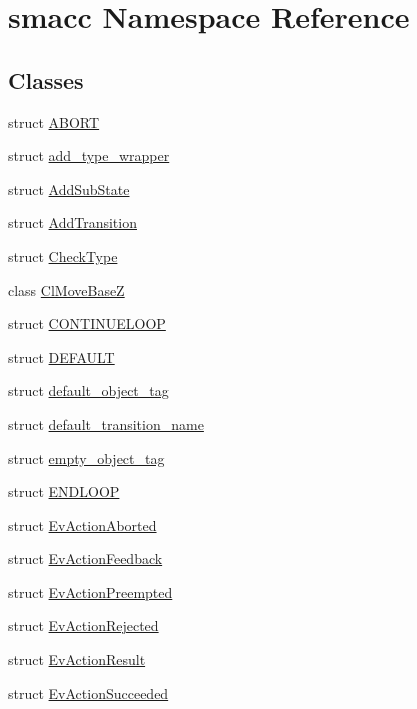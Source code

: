 \hypertarget{namespacesmacc}{}\section{smacc Namespace Reference}
\label{namespacesmacc}
\subsection*{Classes}
\begin{DoxyCompactItemize}
\item 
struct \hyperlink{structsmacc_1_1ABORT}{A\+B\+O\+RT}
\item 
struct \hyperlink{structsmacc_1_1add__type__wrapper}{add\+\_\+type\+\_\+wrapper}
\item 
struct \hyperlink{structsmacc_1_1AddSubState}{Add\+Sub\+State}
\item 
struct \hyperlink{structsmacc_1_1AddTransition}{Add\+Transition}
\item 
struct \hyperlink{structsmacc_1_1CheckType}{Check\+Type}
\item 
class \hyperlink{classsmacc_1_1ClMoveBaseZ}{Cl\+Move\+BaseZ}
\item 
struct \hyperlink{structsmacc_1_1CONTINUELOOP}{C\+O\+N\+T\+I\+N\+U\+E\+L\+O\+OP}
\item 
struct \hyperlink{structsmacc_1_1DEFAULT}{D\+E\+F\+A\+U\+LT}
\item 
struct \hyperlink{structsmacc_1_1default__object__tag}{default\+\_\+object\+\_\+tag}
\item 
struct \hyperlink{structsmacc_1_1default__transition__name}{default\+\_\+transition\+\_\+name}
\item 
struct \hyperlink{structsmacc_1_1empty__object__tag}{empty\+\_\+object\+\_\+tag}
\item 
struct \hyperlink{structsmacc_1_1ENDLOOP}{E\+N\+D\+L\+O\+OP}
\item 
struct \hyperlink{structsmacc_1_1EvActionAborted}{Ev\+Action\+Aborted}
\item 
struct \hyperlink{structsmacc_1_1EvActionFeedback}{Ev\+Action\+Feedback}
\item 
struct \hyperlink{structsmacc_1_1EvActionPreempted}{Ev\+Action\+Preempted}
\item 
struct \hyperlink{structsmacc_1_1EvActionRejected}{Ev\+Action\+Rejected}
\item 
struct \hyperlink{structsmacc_1_1EvActionResult}{Ev\+Action\+Result}
\item 
struct \hyperlink{structsmacc_1_1EvActionSucceeded}{Ev\+Action\+Succeeded}

\end{DoxyCompactItemize}
